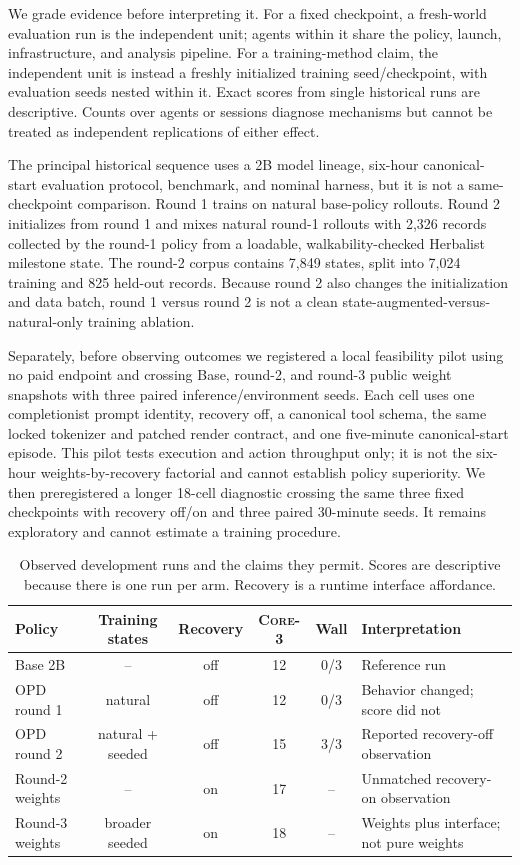 \documentclass[11pt,a4paper]{article}
\newcommand{\core}{\textsc{Core-3}}
\begin{document}
We grade evidence before interpreting it. For a fixed checkpoint, a fresh-world
evaluation run is the independent unit; agents within it share the policy,
launch, infrastructure, and analysis pipeline. For a training-method claim, the
independent unit is instead a freshly initialized training seed/checkpoint, with
evaluation seeds nested within it. Exact scores from single historical runs are
descriptive. Counts over agents or sessions diagnose mechanisms but cannot be
treated as independent replications of either effect.

The principal historical sequence uses a 2B model lineage, six-hour
canonical-start evaluation protocol, benchmark, and nominal harness, but it is
not a same-checkpoint comparison. Round 1 trains on natural base-policy rollouts.
Round 2 initializes from round 1 and mixes natural
round-1 rollouts with 2,326 records collected by the round-1 policy from a
loadable, walkability-checked Herbalist milestone state. The round-2 corpus contains 7,849 states,
split into 7,024 training and 825 held-out records. Because round 2 also changes
the initialization and data batch, round 1 versus round 2 is not a clean
state-augmented-versus-natural-only training ablation.

Separately, before observing outcomes we registered a local feasibility pilot
using no paid endpoint and crossing Base, round-2, and round-3 public weight snapshots
with three paired inference/environment seeds. Each cell uses one completionist
prompt identity, recovery off, a canonical tool schema, the same locked
tokenizer and patched render contract, and one five-minute canonical-start
episode. This pilot tests execution and action throughput only; it is not the
six-hour weights-by-recovery factorial and cannot establish policy superiority.
We then preregistered a longer 18-cell diagnostic crossing the same three fixed
checkpoints with recovery off/on and three paired 30-minute seeds. It remains
exploratory and cannot estimate a training procedure.

\begin{table}[t]
\caption{Observed development runs and the claims they permit. Scores are
descriptive because there is one run per arm. Recovery is a runtime interface
affordance.}
\label{tab:arms}
\centering
\small
\setlength{\tabcolsep}{5pt}
\begin{tabular}{lccccl}
\toprule
Policy & Training states & Recovery & \core{} & Wall & Interpretation \\
\midrule
Base 2B & -- & off & 12 & 0/3 & Reference run \\
OPD round 1 & natural & off & 12 & 0/3 & Behavior changed; score did not \\
OPD round 2 & natural + seeded & off & 15 & 3/3 & Reported recovery-off observation \\
Round-2 weights & -- & on & 17 & -- & Unmatched recovery-on observation \\
Round-3 weights & broader seeded & on & 18 & -- & Weights plus interface; not pure weights \\
\bottomrule
\end{tabular}
\end{table}
\end{document}
